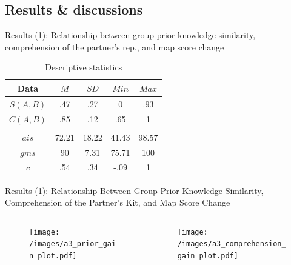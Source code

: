 \subsection{Results \& discussions}
\begin{frame}{Results (1): Relationship between group prior knowledge similarity, 
   comprehension of the partner's rep., and map score change}

\begin{table}[tb]
    \caption{Descriptive statistics}
    \label{desc_stat}
    \begin{center}
        \begin{tabular}{c|c|c|c|c}
            \hline
            Data & $M$ & $SD$ & $Min$ & $Max$\\
            \hline
            $S(A, B)$ & .47 & .27 & 0 & .93 \\
            $C(A, B)$ & .85 & .12 & .65 & 1 \\
            & & & &\\
            $ais$ & 72.21 & 18.22 & 41.43 & 98.57 \\
            $gms$ & 90 & 7.31 & 75.71 & 100 \\
            $c$ & .54 & .34 & -.09 & 1 \\
            \hline
        \end{tabular}
    \end{center}
\end{table}
\end{frame}


\begin{frame}{Results (1): Relationship Between Group Prior Knowledge Similarity, 
   Comprehension of the Partner’s Kit, and Map Score Change}
    \begin{columns}
        \begin{column}{0.5\textwidth}
            \begin{center}
                \begin{figure}[tb]
                    \texttt{[image: /images/a3\_prior\_gain\_plot.pdf]}
                    \label{prior_gain}
                \end{figure}
            \end{center}
        \end{column}
        \begin{column}{0.5\textwidth}  %
            \begin{center}
                \begin{figure}[tb]
                    \texttt{[image: /images/a3\_comprehension\_gain\_plot.pdf]}
                    \label{comprehension_gain}
                \end{figure}
            \end{center}
        \end{column}
    \end{columns} 
\end{frame}


